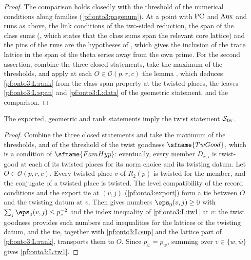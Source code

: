 \begin{proof}
The comparison holds closedly with the threshold of the numerical conditions along families
(\cref{pf:onto3:pagenum}). At a point with $\mathrm{PC}$ and $\mathrm{Aux}$ and runs as above, the link
conditions of the two-sided reduction, the span of the class sums
(, which states that the class sums span the relevant
core lattice) and the pins of the runs are the hypotheses of
, which gives the inclusion of the trace
lattice in the span of the theta series away from the own prime. For the second assertion, combine the three
closed statements, take the maximum of the thresholds, and apply at each $O\in\mathcal O(p,r,c)$ the lemma
, which deduces \ref{pf:onto3:L:rank} from the
class-span property at the twisted places, the leaves \ref{pf:onto3:L:span} and \ref{pf:onto3:L:data} of the
geometric statement, and the comparison.
\end{proof}

\begin{proposition}\label{pf:onto3:twist}
The exported, geometric and rank statements imply the twist statement $\mathcal{S}_{\mathrm{tw}}$.
\end{proposition}

\begin{proof}
Combine the three closed statements and take the maximum of the thresholds, and of the threshold of the twist
goodness $\sfname{TwGood}$, which is a condition of $\sfname{FamHyp}$: eventually, every member $D_{x,i}$ is
twist-good at each of its twisted places for its norm choice and its twisting datum. Let $O\in\mathcal O(p,r,c)$.
Every twisted place $v$ of $R_2(p)$ is twisted for the member, and the conjugate of a twisted place is twisted.
The level compatibility of the record conditions and the export tie at $(v,j)$ (\cref{pf:onto3:export}) form a tie
between $O$ and the twisting datum at $v$. Then 
gives numbers $\eps_0(v,j)\ge0$ with $\sum_j\eps_0(v,j)\le p_v^{-2}$ and the index inequality of \ref{pf:onto3:L:tw1}
at $v$: the twist goodness provides such numbers and inequalities for the lattices of the twisting datum, and the
tie, together with \ref{pf:onto3:L:sup} and the lattice part of \ref{pf:onto3:L:rank}, transports them to $O$.
Since $p_{\bar w}=p_w$, summing over $v\in\{w,\bar w\}$ gives \ref{pf:onto3:L:tw1}.
\end{proof}


